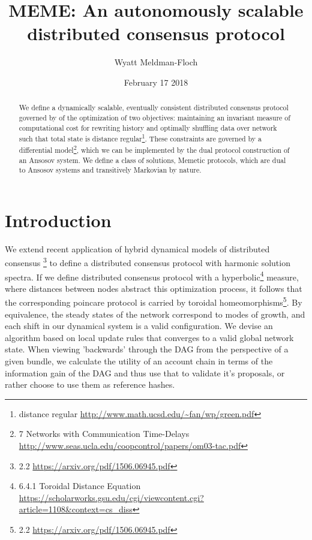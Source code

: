 \documentclass{article}
\title{MEME: An autonomously scalable  distributed consensus protocol}
\author{Wyatt Meldman-Floch}
\date{February 17 2018}
\begin{document}
\maketitle

\begin{abstract}
We define a dynamically scalable, eventually consistent distributed consensus protocol governed by of the optimization of two objectives: maintaining an invariant measure of computational cost for rewriting history and optimally shuffling data over network such that total state is distance regular\footnote{distance regular \url{http://www.math.ucsd.edu/~fan/wp/green.pdf}}. These constraints are governed by a differential model\footnote{7 Networks with Communication Time-Delays \url{http://www.seas.ucla.edu/coopcontrol/papers/om03-tac.pdf}}, which we can be implemented by the dual protocol construction of an Ansosov system. We define a class of solutions, Memetic protocols, which are dual to Ansosov systems and transitively Markovian by nature.

\end{abstract}
\setcounter{secnumdepth}{0}
\section{Introduction}
We extend recent application of hybrid dynamical models of distributed consensus \footnote{2.2 \url{https://arxiv.org/pdf/1506.06945.pdf}} to define a distributed consensus protocol with harmonic solution spectra. If we define distributed consensus protocol with a hyperbolic\footnote{6.4.1 Toroidal Distance Equation \url{https://scholarworks.gsu.edu/cgi/viewcontent.cgi?article=1108&context=cs_diss}} measure, where distances between nodes abstract this optimization process, it follows that the corresponding poincare protocol is carried by toroidal homeomorphisms\footnote{2.2 \url{https://arxiv.org/pdf/1506.06945.pdf}}. By equivalence, the steady states of the network correspond to modes of growth, and each shift in our dynamical system is a valid configuration. We devise an algorithm based on local update rules that converges to a valid global network state. When viewing 'backwards' through the DAG from the perspective of a given bundle, we calculate the utility of an account chain in terms of the information gain of the DAG and thus use that to validate it's proposals, or rather choose to use them as reference hashes.
\end{document}
